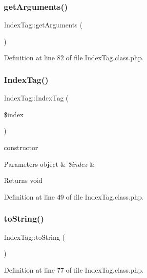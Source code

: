\subsubsection{\texorpdfstring{get\+Arguments()}{getArguments()}}
{\footnotesize\ttfamily Index\+Tag\+::get\+Arguments (\begin{DoxyParamCaption}{ }\end{DoxyParamCaption})}



Definition at line 82 of file Index\+Tag.\+class.\+php.

\mbox{\label{classIndexTag_ad5fcf85307fcc38d75fc1df63ba2b19f}} 
\subsubsection{\texorpdfstring{Index\+Tag()}{IndexTag()}}
{\footnotesize\ttfamily Index\+Tag\+::\+Index\+Tag (\begin{DoxyParamCaption}\item[{}]{\$index }\end{DoxyParamCaption})}

constructor 
\begin{DoxyParams}[1]{Parameters}
object & {\em \$index} & \\
\hline
\end{DoxyParams}
\begin{DoxyReturn}{Returns}
void 
\end{DoxyReturn}


Definition at line 49 of file Index\+Tag.\+class.\+php.

\mbox{\label{classIndexTag_a2ba180bac75a74b01c98c1494fc63b60}} 
\subsubsection{\texorpdfstring{to\+String()}{toString()}}
{\footnotesize\ttfamily Index\+Tag\+::to\+String (\begin{DoxyParamCaption}{ }\end{DoxyParamCaption})}



Definition at line 77 of file Index\+Tag.\+class.\+php.



